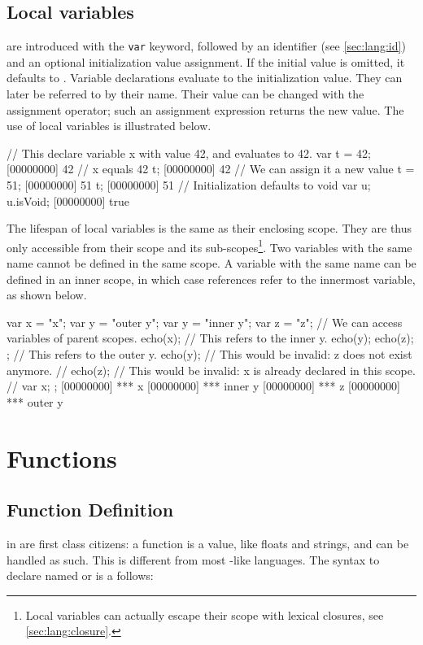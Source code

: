 \subsection{Local variables}
\label{sec:lang:var}
 are introduced with the \lstinline{var} keyword,
followed by an identifier (see \autoref{sec:lang:id}) and an optional
initialization value assignment. If the initial value is omitted, it
defaults to . Variable declarations evaluate to the
initialization value. They can later be referred to by their name. Their
value can be changed with the assignment operator; such an assignment
expression returns the new value. The use of local variables is illustrated
below.

\begin{urbiscript}
// This declare variable x with value 42, and evaluates to 42.
var t = 42;
[00000000] 42
// x equals 42
t;
[00000000] 42
// We can assign it a new value
t = 51;
[00000000] 51
t;
[00000000] 51
// Initialization defaults to void
var u;
u.isVoid;
[00000000] true
\end{urbiscript}

The lifespan of local variables is the same as their enclosing scope. They
are thus only accessible from their scope and its
sub-scopes\footnote{Local variables can actually escape their scope
  with lexical closures, see \autoref{sec:lang:closure}.}. Two
variables with the same name cannot be defined in the same scope. A
variable with the same name can be defined in an inner scope, in which
case references refer to the innermost variable, as shown below.

\begin{urbiscript}
{
  var x = "x";
  var y = "outer y";
  {
    var y = "inner y";
    var z = "z";
    // We can access variables of parent scopes.
    echo(x);
    // This refers to the inner y.
    echo(y);
    echo(z);
  };
  // This refers to the outer y.
  echo(y);
  // This would be invalid: z does not exist anymore.
  // echo(z);
  // This would be invalid: x is already declared in this scope.
  // var x;
};
[00000000] *** x
[00000000] *** inner y
[00000000] *** z
[00000000] *** outer y
\end{urbiscript}


\section{Functions}

\subsection{Function Definition}
\label{sec:lang:function}
 in \us are first class citizens: a function is a value, like
floats and strings, and can be handled as such.  This is different from most
\langC-like languages.  The syntax to declare named or  is a follows:

